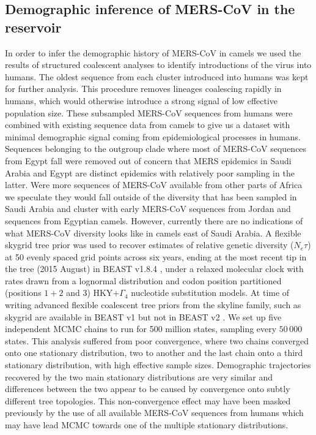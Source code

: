 \documentclass[9pt,lineno]{elife}
\begin{document}
\subsection*{Demographic inference of MERS-CoV in the reservoir}
In order to infer the demographic history of MERS-CoV in camels we used the results of structured coalescent analyses to identify introductions of the virus into humans.
The oldest sequence from each cluster introduced into humans was kept for further analysis.
This procedure removes lineages coalescing rapidly in humans, which would otherwise introduce a strong signal of low effective population size.
These subsampled MERS-CoV sequences from humans were combined with existing sequence data from camels to give us a dataset with minimal demographic signal coming from epidemiological processes in humans.
Sequences belonging to the outgroup clade where most of MERS-CoV sequences from Egypt fall were removed out of concern that MERS epidemics in Saudi Arabia and Egypt are distinct epidemics with relatively poor sampling in the latter.
Were more sequences of MERS-CoV available from other parts of Africa we speculate they would fall outside of the diversity that has been sampled in Saudi Arabia and cluster with early MERS-CoV sequences from Jordan and sequences from Egyptian camels.
However, currently there are no indications of what MERS-CoV diversity looks like in camels east of Saudi Arabia.
A flexible skygrid tree prior \citep{gill_2013} was used to recover estimates of relative genetic diversity ($N_{e}\tau$) at 50 evenly spaced grid points across six years, ending at the most recent tip in the tree (2015 August) in BEAST v1.8.4 \citep{drummond_bayesian_2012}, under a relaxed molecular clock with rates drawn from a lognormal distribution \citep{drummond_2006} and codon position partitioned (positions $1+2$ and $3$) HKY$+\Gamma_{4}$ \citep{hky_1985,yang_1994} nucleotide substitution models.
At time of writing advanced flexible coalescent tree priors from the skyline family, such as skygrid \citep{gill_2013} are available in BEAST v1 \citep{drummond_bayesian_2012} but not in BEAST v2 \citep{bouckaert_beast_2014}.
We set up five independent MCMC chains to run for 500 million states, sampling every $50\,000$ states.
This analysis suffered from poor convergence, where two chains converged onto one stationary distribution, two to another and the last chain onto a third stationary distribution, with high effective sample sizes.
Demographic trajectories recovered by the two main stationary distributions are very similar and differences between the two appear to be caused by convergence onto subtly different tree topologies.
This non-convergence effect may have been masked previously by the use of all available MERS-CoV sequences from humans which may have lead MCMC towards one of the multiple stationary distributions.
\end{document}
